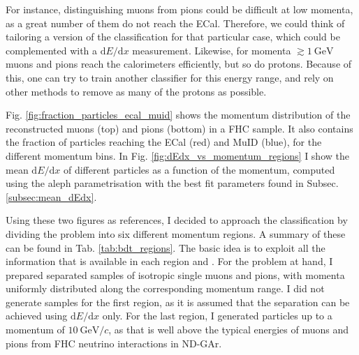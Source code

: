 For instance, distinguishing muons from pions could be difficult at low momenta, as a great number of them do not reach the ECal. Therefore, we could think of tailoring a version of the classification for that particular case, which could be complemented with a $\mathrm{d}E/\mathrm{d}x$ measurement. Likewise, for momenta $\gtrsim 1~\mathrm{GeV}$ muons and pions reach the calorimeters efficiently, but so do protons. Because of this, one can try to train another classifier for this energy range, and rely on other methods to remove as many of the protons as possible.

Fig. \ref{fig:fraction_particles_ecal_muid} shows the momentum distribution of the reconstructed muons (top) and pions (bottom) in a FHC sample. It also contains the fraction of particles reaching the ECal (red) and MuID (blue), for the different momentum bins. In Fig. \ref{fig:dEdx_vs_momentum_regions} I show the mean $\mathrm{d}E/\mathrm{d}x$ of different particles as a function of the momentum, computed using the \gls{aleph} parametrisation with the best fit parameters found in Subsec. \ref{subsec:mean_dEdx}.

Using these two figures as references, I decided to approach the classification by dividing the problem into six different momentum regions. A summary of these can be found in Tab. \ref{tab:bdt_regions}. The basic idea is to exploit all the information that is available in each region and . For the problem at hand, I prepared separated samples of isotropic single muons and pions, with momenta uniformly distributed along the corresponding momentum range. I did not generate samples for the first region, as it is assumed that the separation can be achieved using $\mathrm{d}E/\mathrm{d}x$ only. For the last region, I generated particles up to a momentum of $10~\mathrm{GeV}/c$, as that is well above the typical energies of muons and pions from FHC neutrino interactions in ND-GAr.

